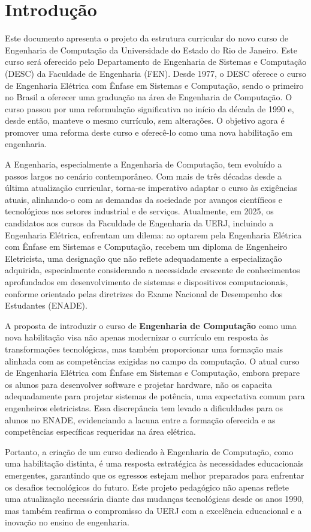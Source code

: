 \chapter{Introdução}
\label{intro} %

Este documento apresenta o projeto da estrutura curricular do novo curso de Engenharia de Computação da Universidade do Estado do Rio de Janeiro. Este curso será oferecido pelo Departamento de Engenharia de Sistemas e Computação (DESC) da Faculdade de Engenharia (FEN). Desde 1977, o DESC oferece o curso de Engenharia Elétrica com Ênfase em Sistemas e Computação, sendo o primeiro no Brasil a oferecer uma graduação na área de Engenharia de Computação. O curso passou por uma reformulação significativa no início da década de 1990 e, desde então, manteve o mesmo currículo, sem alterações. O objetivo agora é promover uma reforma deste curso e oferecê-lo como uma nova habilitação em engenharia.

A Engenharia, especialmente a Engenharia de Computação, tem evoluído a passos largos no cenário contemporâneo. Com mais de três décadas desde a última atualização curricular, torna-se imperativo adaptar o curso às exigências atuais, alinhando-o com as demandas da sociedade por avanços científicos e tecnológicos nos setores industrial e de serviços. Atualmente, em 2025, os candidatos aos cursos da Faculdade de Engenharia da UERJ, incluindo a Engenharia Elétrica, enfrentam um dilema: ao optarem pela Engenharia Elétrica com Ênfase em Sistemas e Computação, recebem um diploma de Engenheiro Eletricista, uma designação que não reflete adequadamente a especialização adquirida, especialmente considerando a necessidade crescente de conhecimentos aprofundados em desenvolvimento de sistemas e dispositivos computacionais, conforme orientado pelas diretrizes do Exame Nacional de Desempenho dos Estudantes (ENADE).

A proposta de introduzir o curso de \textbf{Engenharia de Computação} como uma nova habilitação visa não apenas modernizar o currículo em resposta às transformações tecnológicas, mas também proporcionar uma formação mais alinhada com as competências exigidas no campo da computação. O atual curso de Engenharia Elétrica com Ênfase em Sistemas e Computação, embora prepare os alunos para desenvolver software e projetar hardware, não os capacita adequadamente para projetar sistemas de potência, uma expectativa comum para engenheiros eletricistas. Essa discrepância tem levado a dificuldades para os alunos no ENADE, evidenciando a lacuna entre a formação oferecida e as competências específicas requeridas na área elétrica.

Portanto, a criação de um curso dedicado à Engenharia de Computação, como uma habilitação distinta, é uma resposta estratégica às necessidades educacionais emergentes, garantindo que os egressos estejam melhor preparados para enfrentar os desafios tecnológicos do futuro. Este projeto pedagógico não apenas reflete uma atualização necessária diante das mudanças tecnológicas desde os anos 1990, mas também reafirma o compromisso da UERJ com a excelência educacional e a inovação no ensino de engenharia.